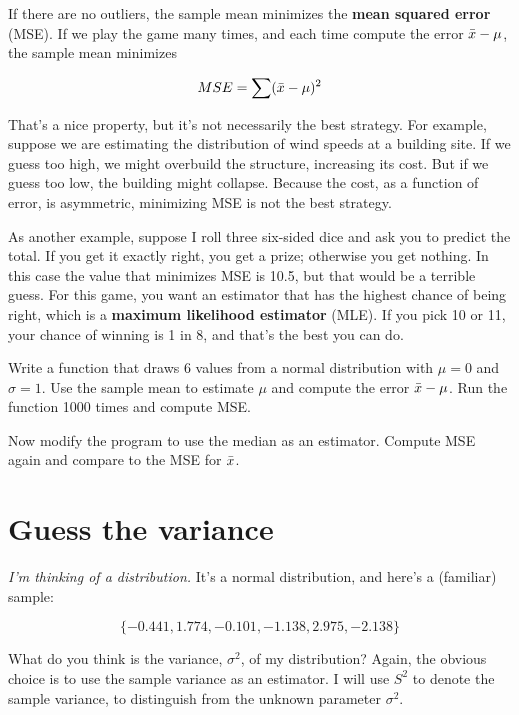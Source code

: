 \documentclass[12pt]{book}
\begin{document}
If there are no outliers, the sample mean minimizes the {\bf mean squared
error} (MSE).  If we play the game many times, and each time
compute the error $\bar{x} - \mu$, the sample mean minimizes

\[ MSE = \sum (\bar{x} - \mu)^2 \]

That's a nice property, but it's not necessarily the best strategy.
For example, suppose we are estimating the distribution of wind speeds
at a building site.  If we guess too high, we might overbuild the structure,
increasing its cost.  But if we guess too low, the building might collapse.
Because the cost, as a function of error, is asymmetric, minimizing
MSE is not the best strategy.

As another example, suppose I roll three six-sided dice and ask you
to predict the total.  If you get it exactly right, you get a prize;
otherwise you get nothing.  In this case the value that minimizes MSE
is 10.5, but that would be a terrible guess.  For this game, you
want an estimator that has the highest chance of being right, which is
a {\bf maximum likelihood estimator} (MLE).  If you pick 10 or 11, your
chance of winning is 1 in 8, and that's the best you can do.

\begin{ex}

Write a function that draws 6 values from a normal distribution with
$\mu=0$ and $\sigma=1$.  Use the sample mean to estimate $\mu$ and
compute the error $\bar{x} - \mu$.  Run the function 1000 times and
compute MSE.

Now modify the program to use the median as an
estimator.  Compute MSE again and compare to the MSE for $\bar{x}$.

\end{ex}


\section{Guess the variance}

{\em I'm thinking of a distribution.}  It's a normal distribution, and 
here's a (familiar) sample:

\[ \{ -0.441, 1.774, -0.101, -1.138, 2.975, -2.138 \} \]

What do you think is the variance, $\sigma^2$, of my distribution?
Again, the obvious choice is to use the sample variance as an estimator.
I will use $S^2$ to denote the sample variance, to distinguish from the
unknown parameter $\sigma^2$.
\end{document}
